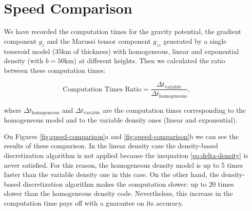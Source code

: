 \documentclass[extra]{gji}
\begin{document}

\section{Speed Comparison}

We have recorded the computation times for the gravity potential, the gradient component $g_z$ and the Marussi tensor component $g_{zz}$ generated by a single tesseroid model ($35$km of thickness) with homogeneous, linear and exponential density (with $b=50$km) at different heights. Then we calculated the ratio between these computation times:

\begin{equation}
    \text{Computation Times Ratio} =
        \frac{\Delta t_\text{variable}}{\Delta t_\text{homogeneous}},
    \label{eq:computation-times-ratio}
\end{equation}

\noindent where $\Delta t_\text{homogeneous}$ and $\Delta t_\text{variable}$ are the computation times corresponding to the homogeneous model and to the variable density ones (linear and exponential).

On Figures \ref{fig:speed-comparison}a and \ref{fig:speed-comparison}b we can see the results of these comparison.
In the linear density case the density-based discretization algorithm is not applied because the inequation \ref{eq:delta-density} is never satisfied.
For this reason, the homogeneous density model is up to 5 times faster than the variable density one in this case.
On the other hand, the density-based discretization algorithm makes the computation slower: up to 20 times slower than the homogeneous density code.
Nevertheless, this increase in the computation time pays off with a guarantee on its accuracy.
\end{document}
